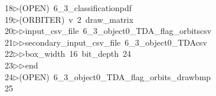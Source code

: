 \begin{tabbing}
18\>$\triangleright$\>(OPEN)\ 6\_3\_classificationpdf\\[0pt]
19\>$\triangleright$\>(ORBITER)\ v\ 2\ draw\_matrix\ \\[0pt]
20\>$\triangleright$\>$\triangleright$\>input\_csv\_file\ 6\_3\_object0\_TDA\_flag\_orbitscsv\ \\[0pt]
21\>$\triangleright$\>$\triangleright$\>secondary\_input\_csv\_file\ 6\_3\_object0\_TDAcsv\ \\[0pt]
22\>$\triangleright$\>$\triangleright$\>box\_width\ 16\ bit\_depth\ 24\ \\[0pt]
23\>$\triangleright$\>$\triangleright$\>end\\[0pt]
24\>$\triangleright$\>(OPEN)\ 6\_3\_object0\_TDA\_flag\_orbits\_drawbmp\\[0pt]
25\>\end{tabbing}
